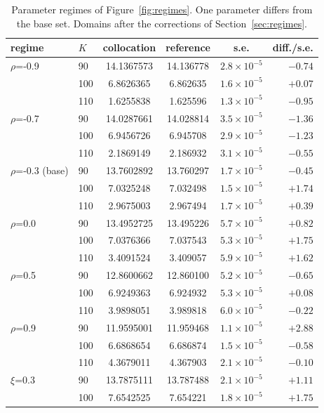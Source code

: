 \begin{table}[h]
\centering
\caption{Parameter regimes of Figure~\ref{fig:regimes}. One parameter differs from the base set.
Domains after the corrections of Section~\ref{sec:regimes}.}
\label{tab:regimes}
\small
\begin{tabular}{llcccr}
\toprule
regime & $K$ & collocation & reference & s.e. & diff./s.e.\\
\midrule
$\rho$=-0.9 & 90 & 14.1367573 & 14.136778 & $2.8\times10^{-5}$ & $-0.74$\\
 & 100 & 6.8626365 & 6.862635 & $1.6\times10^{-5}$ & $+0.07$\\
 & 110 & 1.6255838 & 1.625596 & $1.3\times10^{-5}$ & $-0.95$\\
\addlinespace[2pt]
$\rho$=-0.7 & 90 & 14.0287661 & 14.028814 & $3.5\times10^{-5}$ & $-1.36$\\
 & 100 & 6.9456726 & 6.945708 & $2.9\times10^{-5}$ & $-1.23$\\
 & 110 & 2.1869149 & 2.186932 & $3.1\times10^{-5}$ & $-0.55$\\
\addlinespace[2pt]
$\rho$=-0.3 (base) & 90 & 13.7602892 & 13.760297 & $1.7\times10^{-5}$ & $-0.45$\\
 & 100 & 7.0325248 & 7.032498 & $1.5\times10^{-5}$ & $+1.74$\\
 & 110 & 2.9675003 & 2.967494 & $1.7\times10^{-5}$ & $+0.39$\\
\addlinespace[2pt]
$\rho$=0.0 & 90 & 13.4952725 & 13.495226 & $5.7\times10^{-5}$ & $+0.82$\\
 & 100 & 7.0376366 & 7.037543 & $5.3\times10^{-5}$ & $+1.75$\\
 & 110 & 3.4091524 & 3.409057 & $5.9\times10^{-5}$ & $+1.62$\\
\addlinespace[2pt]
$\rho$=0.5 & 90 & 12.8600662 & 12.860100 & $5.2\times10^{-5}$ & $-0.65$\\
 & 100 & 6.9249363 & 6.924932 & $5.3\times10^{-5}$ & $+0.08$\\
 & 110 & 3.9898051 & 3.989818 & $6.0\times10^{-5}$ & $-0.22$\\
\addlinespace[2pt]
$\rho$=0.9 & 90 & 11.9595001 & 11.959468 & $1.1\times10^{-5}$ & $+2.88$\\
 & 100 & 6.6868654 & 6.686874 & $1.5\times10^{-5}$ & $-0.58$\\
 & 110 & 4.3679011 & 4.367903 & $2.1\times10^{-5}$ & $-0.10$\\
\addlinespace[2pt]
$\xi$=0.3 & 90 & 13.7875111 & 13.787488 & $2.1\times10^{-5}$ & $+1.11$\\
 & 100 & 7.6542525 & 7.654221 & $1.8\times10^{-5}$ & $+1.75$\\

\end{tabular}
\end{table}
